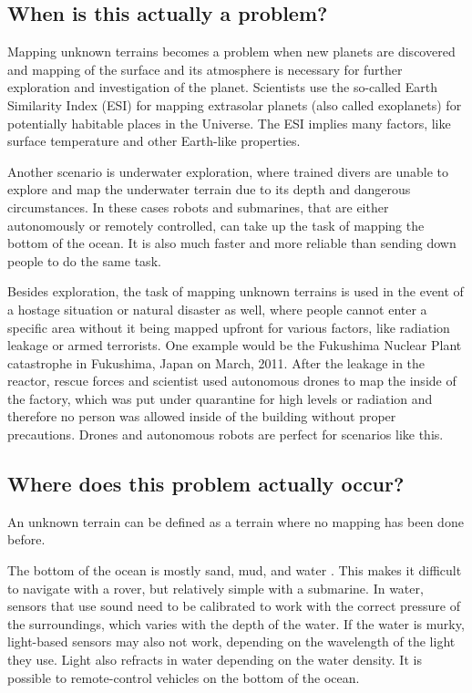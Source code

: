 \subsection{When is this actually a problem?}
Mapping unknown terrains becomes a problem when new planets are discovered and mapping of the surface and its atmosphere is necessary for further exploration and investigation of the planet. Scientists use the so-called Earth Similarity Index (ESI) for mapping extrasolar planets (also called exoplanets) for potentially habitable places in the Universe\cite{exoplanets}\cite{esi}. The ESI implies many factors, like surface temperature and other Earth-like properties. 

Another scenario is underwater exploration, where trained divers are unable to explore and map the underwater terrain due to its depth and dangerous circumstances. In these cases robots and submarines, that are either autonomously or remotely controlled, can take up the task of mapping the bottom of the ocean. It is also much faster and more reliable than sending down people to do the same task.

Besides exploration, the task of mapping unknown terrains is used in the event of a hostage situation or natural disaster as well, where people cannot enter a specific area without it being mapped upfront for various factors, like radiation leakage or armed terrorists. One example would be the Fukushima Nuclear Plant catastrophe in Fukushima, Japan on March, 2011. After the leakage in the reactor, rescue forces and scientist used autonomous drones to map the inside of the factory\cite{fukushima}, which was put under quarantine for high levels or radiation and therefore no person was allowed inside of the building without proper precautions. Drones and autonomous robots are perfect for scenarios like this.

\clearpage
\subsection{Where does this problem actually occur?}
An unknown terrain can be defined as a terrain where no mapping has been done before.

The bottom of the ocean is mostly sand, mud, and water %
. This makes it difficult to navigate with a rover, but relatively simple with a submarine. In water, sensors that use sound need to be calibrated to work with the correct pressure of the surroundings, which varies with the depth of the water. If the water is murky, light-based sensors may also not work, depending on the wavelength of the light they use. Light also refracts in water depending on the water density. It is possible to remote-control vehicles on the bottom of the ocean. %

